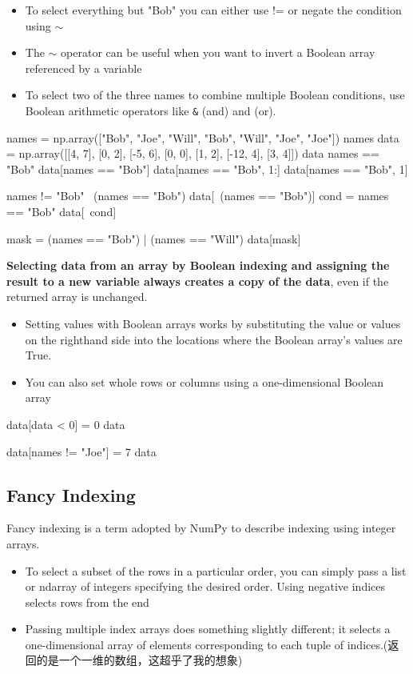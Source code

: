 \begin{itemize}
    \item To select everything but "Bob" you can either use != or negate the condition using $\sim$
    \item The $\sim$ operator can be useful when you want to invert a Boolean array referenced by a variable
    \item To select two of the three names to combine multiple Boolean conditions, use Boolean arithmetic operators like \verb|&| (and) and \textbar (or).
\end{itemize}

\begin{pyc}
names = np.array(["Bob", "Joe", "Will", "Bob", "Will", "Joe", "Joe"])
names
data = np.array([[4, 7], [0, 2], [-5, 6], [0, 0], [1, 2], [-12, 4], [3, 4]])
data
names == "Bob"
data[names == "Bob"]
data[names == "Bob", 1:]
data[names == "Bob", 1]

names != "Bob"
~(names == "Bob")
data[~(names == "Bob")]
cond = names == "Bob"
data[~cond]

mask = (names == "Bob") | (names == "Will")
data[mask]  
\end{pyc}

\textbf{Selecting data from an array by Boolean indexing and assigning the result to a new variable always creates a copy of the data}, even if the returned array is unchanged.


\begin{itemize}
    \item Setting values with Boolean arrays works by substituting the value or values on the righthand side into the locations where the Boolean array’s values are True.
    \item You can also set whole rows or columns using a one-dimensional Boolean array
\end{itemize}

\begin{pyc}
data[data < 0] = 0
data

data[names != "Joe"] = 7
data
\end{pyc}
\subsection{Fancy Indexing}
Fancy indexing is a term adopted by NumPy to describe indexing using integer arrays.
\begin{itemize}
    \item To select a subset of the rows in a particular order, you can simply pass a list or
    ndarray of integers specifying the desired order. Using negative indices selects rows from
    the end
    \item Passing multiple index arrays does something slightly different; it selects a one-dimensional array of elements corresponding to each tuple of indices.(返回的是一个一维的数组，这超乎了我的想象)
\end{itemize}

